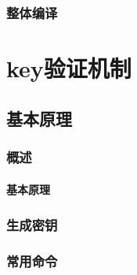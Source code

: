 \documentclass[a4paper,10pt]{article}
\begin{document}
\begin{CJK}{UTF8}{gbsn}
\subsection{}
\subsubsection{}
\section{整体编译}
\subsection{}
\subsubsection{}

\part{key验证机制}
\chapter{基本原理}
\section{概述}
\subsection{基本原理}
\subsubsection{}
\section{生成密钥}
\subsection{}
\subsubsection{}
\section{常用命令}
\subsection{}

\end{CJK}
\end{document}
